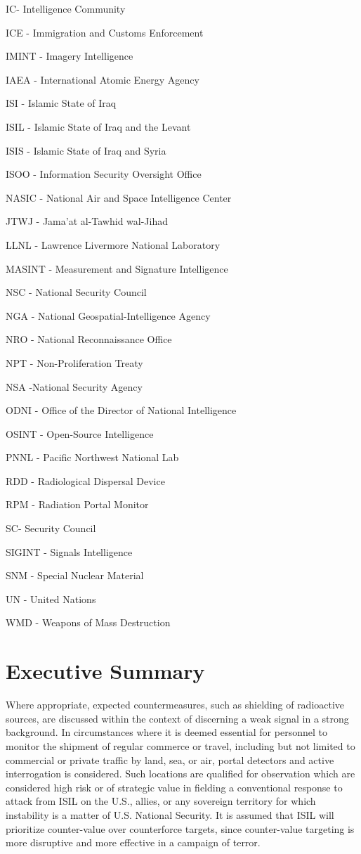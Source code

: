 \documentclass{report}
\begin{document}
IC- Intelligence Community

ICE - Immigration and Customs Enforcement

IMINT - Imagery Intelligence 

IAEA - International Atomic Energy Agency 

ISI - Islamic State of Iraq

ISIL - Islamic State of Iraq and the Levant

ISIS - Islamic State of Iraq and Syria

ISOO - Information Security Oversight Office

NASIC - National Air and Space Intelligence Center 

JTWJ - Jama'at al-Tawhid wal-Jihad 

LLNL - Lawrence Livermore National Laboratory

MASINT - Measurement and Signature Intelligence 

NSC - National Security Council  

NGA - National Geospatial-Intelligence Agency 

NRO - National Reconnaissance Office

NPT - Non-Proliferation Treaty

NSA -National Security Agency

ODNI - Office of the Director of National Intelligence

OSINT - Open-Source Intelligence

PNNL - Pacific Northwest National Lab

RDD - Radiological Dispersal Device

RPM - Radiation Portal Monitor

SC- Security Council

SIGINT - Signals Intelligence 

SNM - Special Nuclear Material

UN - United Nations

WMD - Weapons of Mass Destruction

\newpage

\pagestyle{fancy2}


\chapter{Executive Summary}

Where appropriate, expected countermeasures, such as shielding of radioactive sources, are discussed within the context of discerning a weak signal in a strong background. In circumstances where it is deemed essential for personnel to monitor the shipment of regular commerce or travel, including but not limited to commercial or private traffic by land, sea, or air, portal detectors and active interrogation is considered. Such locations are qualified for observation which are considered high risk or of strategic value in fielding a conventional response to attack from ISIL on the U.S., allies, or any sovereign territory for which instability is a matter of U.S. National Security. It is assumed that ISIL will prioritize counter-value over counterforce targets, since counter-value targeting is more disruptive and more effective in a campaign of terror.
\end{document}
